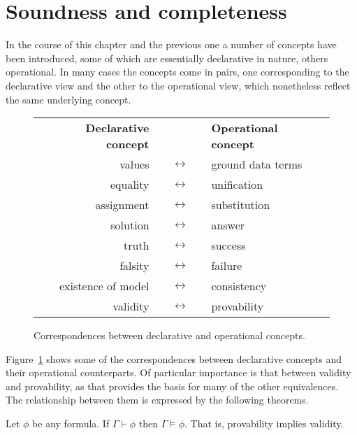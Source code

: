 \section{Soundness and completeness}
\label{sec:meta}

In the course of this chapter and the previous one
a number of concepts have been introduced,
some of which are essentially declarative in nature,
others operational.
In many cases the concepts come in pairs,
one corresponding to the declarative view
and the other to the operational view,
which nonetheless reflect the same underlying concept.

\begin{figure}
\begin{center}
\begin{tabular}{rcl}
\bf{Declarative concept} & & \bf{Operational concept} \\[1em]
values & $\quad\longleftrightarrow\quad$ & ground data terms \\
equality & $\quad\longleftrightarrow\quad$ & unification \\
assignment & $\quad\longleftrightarrow\quad$ & substitution \\
solution & $\quad\longleftrightarrow\quad$ & answer \\
truth & $\quad\longleftrightarrow\quad$ & success \\
falsity & $\quad\longleftrightarrow\quad$ & failure \\
existence of model & $\quad\longleftrightarrow\quad$ & consistency \\
validity & $\quad\longleftrightarrow\quad$ & provability
\end{tabular}
\end{center}
\caption{
Correspondences between declarative and operational concepts.
\label{fig:correspondence}
}
\end{figure}

Figure~\ref{fig:correspondence} shows some of the correspondences
between declarative concepts and their operational counterparts.
Of particular importance is that between validity and provability,
as that provides the basis for many of the other equivalences.
The relationship between them
is expressed by the following theorems.

\begin{theorem}[Soundness] \label{thm:soundness}
Let $\phi$ be any formula.
If\: $\Gamma \vdash \phi$ then $\Gamma \models \phi$.
That is, provability implies validity.
\end{theorem}

